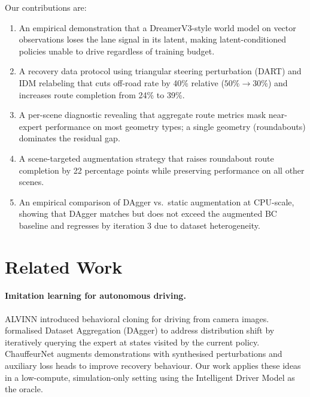 \documentclass{article}
\begin{document}
Our contributions are:
\begin{enumerate}
  \item An empirical demonstration that a DreamerV3-style world model on
    vector observations loses the lane signal in its latent, making
    latent-conditioned policies unable to drive regardless of training
    budget.
  \item A recovery data protocol using triangular steering perturbation
    (DART) and IDM relabeling that cuts off-road rate by 40\% relative
    ($50\%\to30\%$) and increases route completion from 24\% to 39\%.
  \item A per-scene diagnostic revealing that aggregate route metrics mask
    near-expert performance on most geometry types; a single geometry
    (roundabouts) dominates the residual gap.
  \item A scene-targeted augmentation strategy that raises roundabout
    route completion by 22 percentage points while preserving performance
    on all other scenes.
  \item An empirical comparison of DAgger vs.\ static augmentation at
    CPU-scale, showing that DAgger matches but does not exceed the
    augmented BC baseline and regresses by iteration 3 due to dataset
    heterogeneity.
\end{enumerate}

\section{Related Work}
\label{sec:related}

\paragraph{Imitation learning for autonomous driving.}
ALVINN \citep{pomerleau1989alvinn} introduced behavioral cloning for
driving from camera images. \citet{ross2011dagger} formalised Dataset
Aggregation (DAgger) to address distribution shift by iteratively querying
the expert at states visited by the current policy. ChauffeurNet
\citep{bansal2019chauffeurnet} augments demonstrations with synthesised
perturbations and auxiliary loss heads to improve recovery behaviour.
Our work applies these ideas in a low-compute, simulation-only setting
using the Intelligent Driver Model as the oracle.
\end{document}
